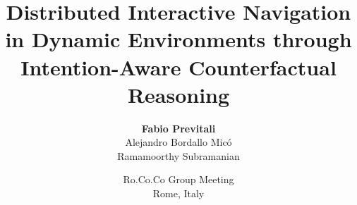 \documentclass{beamer}
\title[Distributed Interactive Navigation through Intention-Aware Reasoning]{\Large Distributed Interactive Navigation in Dynamic Environments through Intention-Aware Counterfactual Reasoning}
\subtitle{}
\author[Fabio Previtali]{\large\textbf{Fabio Previtali}\\Alejandro Bordallo Mic\'o\\Ramamoorthy Subramanian}
\date[February 26, 2015]{\small Ro.Co.Co Group Meeting\\Rome, Italy}
\begin{document}
\begin{frame}[plain]
	\titlepage
\end{frame}






\tiny


\end{document}
